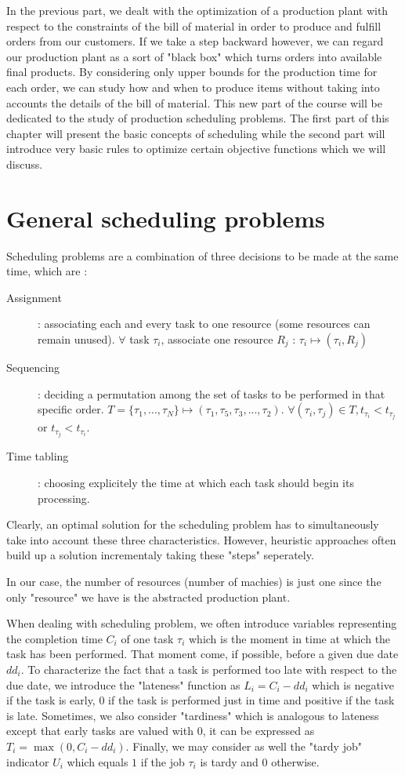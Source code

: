 In the previous part, we dealt with the optimization of a production plant with respect to the constraints of the bill of material in order to produce and fulfill orders from our customers. If we take a step backward however, we can regard our production plant as a sort of "black box" which turns orders into available final products. By considering only upper bounds for the production time for each order, we can study how and when to produce items without taking into accounts the details of the bill of material. This new part of the course will be dedicated to the study of production scheduling problems. The first part of this chapter will present the basic concepts of scheduling while the second part will introduce very basic rules to optimize certain objective functions which we will discuss. 

\section{General scheduling problems}

Scheduling problems are a combination of three decisions to be made at the same time, which are : 
\begin{description}
    \item[Assignment] : associating each and every task to one resource (some resources can remain unused). $\forall$ task $\tau_i$, associate one resource $R_j$ : $\tau_i \mapsto (\tau_i, R_j)$
    \item[Sequencing] : deciding a permutation among the set of tasks to be performed in that specific order. $T=\{\tau_1, ..., \tau_N\} \mapsto (\tau_1, \tau_5, \tau_3, ..., \tau_2)$. $\forall (\tau_i, \tau_j)\in T, t_{\tau_i} < t_{\tau_j}$ or $t_{\tau_j} < t_{\tau_i}$.
    \item[Time tabling] : choosing explicitely the time at which each task should begin its processing. 
\end{description}
Clearly, an optimal solution for the scheduling problem has to simultaneously take into account these three characteristics. However, heuristic approaches often build up a solution incrementaly taking these "steps" seperately. 

In our case, the number of resources (number of machies) is just one since the only "resource" we have is the abstracted production plant. 

When dealing with scheduling problem, we often introduce variables representing the completion time $C_i$ of one task $\tau_i$ which is the moment in time at which the task has been performed. That moment come, if possible, before a given due date $dd_i$. To characterize the fact that a task is performed too late with respect to the due date, we introduce the "lateness" function as $L_i = C_i - dd_i$ which is negative if the task is early, $0$ if the task is performed just in time and positive if the task is late. Sometimes, we also consider "tardiness" which is analogous to lateness except that early tasks are valued with $0$, it can be expressed as $T_i = \max(0, C_i - dd_i)$. Finally, we may consider as well the "tardy job" indicator $U_i$ which equals $1$ if the job $\tau_i$ is tardy and $0$ otherwise. 

